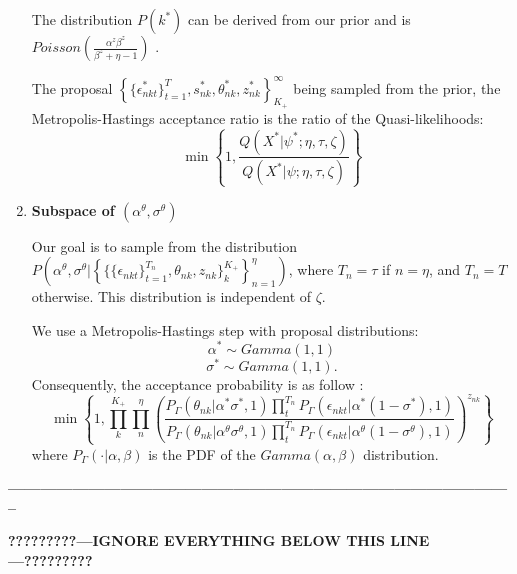 \documentclass[12pt]{article}
\begin{document}
\begin{enumerate}
	The distribution $P(k^*)$ can be derived from our prior and is $Poisson(\frac{\alpha^z \beta^z}{\beta^z+\eta-1})$ \citep
	{griffiths2011indian}. 	
	
	The proposal  $\left\{ \{\epsilon_{nkt}^*\}_{t=1}^T, s_{nk}^*, \theta_{nk}^*,z_{nk}^* \right\}_{K_+}^{\infty}$ being sampled from the prior, the Metropolis-Hastings acceptance ratio is the ratio of the Quasi-likelihoods:
		$$\min\left\{ 1 ,   \frac{
			Q(X^*|\psi^*;\eta,\tau,\zeta) 
	}{
		Q(X^*|\psi;\eta,\tau,\zeta) 
	}  \right\}$$
	
	\item \textbf{Subspace of $\left( \alpha^\theta, \sigma^\theta \right) $}
	
	Our goal is to sample from the distribution $P \left( \alpha^\theta, \sigma^\theta|\left\{
	\{\{\epsilon_{nkt}\}_{t=1}^{T_n}, \theta_{nk} ,z_{nk}\}_k^{K_+}\right\}_{n=1}^\eta \right)$, where  $T_n=\tau$ if $n=\eta$, and $T_n=T$ otherwise. This distribution is independent of $\zeta$.
	
	We use a Metropolis-Hastings step with proposal distributions:
		$$\alpha^* \sim Gamma(1,1)$$
		$$\sigma^* \sim Gamma(1,1).$$
	Consequently, the acceptance probability is as follow : 
	$$\min\left\{ 1 , \prod_{k}^{K_+} \prod_{n}^{\eta} \left( \frac{ 
		P_\Gamma(\theta_{nk}|\alpha^* \sigma^*,1) \prod_{t}^{T_n} P_\Gamma(\epsilon_{nkt}|\alpha^* (1-\sigma^*),1) 
	}{
		P_\Gamma(\theta_{nk}|\alpha^\theta \sigma^\theta,1) \prod_{t}^{T_n} P_\Gamma(\epsilon_{nkt}|\alpha^\theta (1-\sigma^\theta),1) 
	} \right)^{z_{nk}} \right\}$$
	where $P_\Gamma(\cdot|\alpha,\beta)$ is the PDF of the $Gamma(\alpha,\beta)$ distribution.
	
\end{enumerate}

\textbf{-----------------------------------------------------------------------------------------------}

\textbf{?????????---IGNORE EVERYTHING BELOW THIS LINE---?????????}
\end{document}
